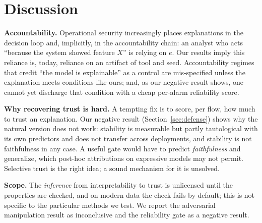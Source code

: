 \documentclass[conference]{IEEEtran}
\begin{document}
\section{Discussion}\label{sec:disc}
\textbf{Accountability.} Operational security increasingly places explanations in the decision
loop and, implicitly, in the accountability chain: an analyst who acts ``because the system
showed feature $X$'' is relying on $e$. Our results imply this reliance is, today, reliance on an
artifact of tool and seed. Accountability regimes that credit ``the model is explainable'' as a
control are mis-specified unless the explanation meets conditions like ours; and, as our negative
result shows, one cannot yet discharge that condition with a cheap per-alarm reliability score.

\textbf{Why recovering trust is hard.} A tempting fix is to score, per flow, how much to trust an
explanation. Our negative result (Section~\ref{sec:defense}) shows why the natural version does
not work: stability is measurable but partly tautological with its own predictors and does not
transfer across deployments, and stability is not faithfulness in any case. A useful gate would
have to predict \emph{faithfulness} and generalize, which post-hoc attributions on expressive
models may not permit. Selective trust is the right idea; a sound mechanism for it is unsolved.

\textbf{Scope.} The \emph{inference} from interpretability to trust is unlicensed until the properties are
checked, and on modern data the check fails by default; this is not specific to the particular methods
we test. We report the adversarial manipulation result as inconclusive and the reliability gate as a
negative result.
\end{document}
